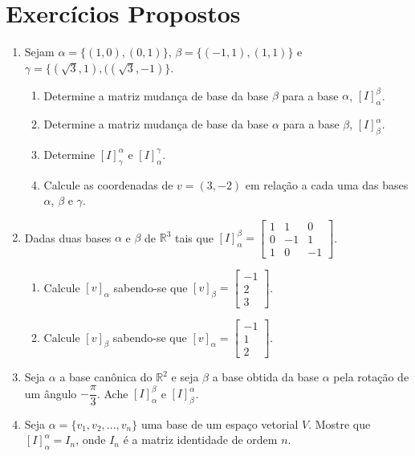 \section{Exercícios Propostos}
\begin{enumerate}
\item Sejam $\alpha=\{ (1,0), (0,1)\}$, $\beta=\{ (-1,1), (1,1)\}$  e $\gamma=\{ (\sqrt{3},1), ((\sqrt{3},-1)\}$.
\begin{enumerate}[label=(\alph*)]
\item Determine a matriz mudança de base da base $\beta$ para a base $\alpha$, $[I]_{\alpha}^{\beta}$.
\item Determine a matriz mudança de base da base $\alpha$ para a base $\beta$, $[I]_{\beta}^{\alpha}$.
\item Determine  $[I]_{\gamma}^{\alpha}$ e $[I]_{\alpha}^{\gamma}$.
\item Calcule as coordenadas de $v=(3,-2)$ em relação a cada uma das bases $\alpha$, $\beta$ e $\gamma$.
\end{enumerate}
\item Dadas duas bases $\alpha$ e $\beta$ de $\mathbb{R}^3$ tais que  $[I]_{\alpha}^{\beta}=\left[ \begin{array}{ccc} 1& 1 &0\\ 0&-1&1\\ 1&0&-1\end{array}\right ]$.
\begin{enumerate}[label=(\alph*)]
\item Calcule $[v]_{\alpha}$ sabendo-se que  $[v]_{\beta}=\left[ \begin{array}{c} -1\\ 2\\ 3\end{array}\right ]$.
\item Calcule $[v]_{\beta}$ sabendo-se que  $[v]_{\alpha}=\left[ \begin{array}{c} -1\\ 1\\ 2\end{array}\right ]$.
\end{enumerate}

\item Seja  $\alpha$ a base canônica do $\mathbb{R}^2$ e  seja $\beta$ a base obtida da base $\alpha$ pela rotação de um ângulo $-\dfrac{\pi}{3}$. Ache $[I]_{\alpha}^{\beta}$ e $[I]_{\beta}^{\alpha}$.

\item Seja $\alpha = \{ v_1, v_2, ..., v_n\}$ uma base de um espaço vetorial $V$. Mostre  que  $[I]_{\alpha}^{\alpha}= I_n$, onde $I_n$ é a matriz identidade de ordem $n$.


\end{enumerate}
